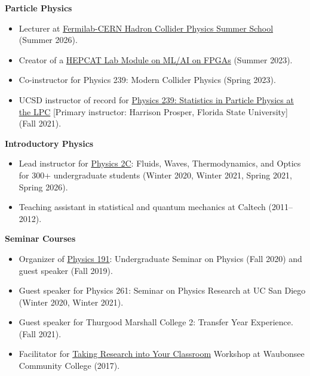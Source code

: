 \documentclass[11pt]{res}
\begin{document}
\begin{resume}
  \textbf{Particle Physics}
  \begin{itemize}
    \itemsep-0.3em
    \item Lecturer at \href{https://indico.fnal.gov/event/71907/}{Fermilab-CERN Hadron Collider Physics Summer School} (Summer 2026).
    \item Creator of a \href{https://hepcat.ucsd.edu/summer-schools/fast-ml-fpga-lab/}{HEPCAT Lab Module on ML/AI on FPGAs} (Summer 2023).
    \item Co-instructor for Physics 239: Modern Collider Physics ({Spring 2023}).
    \item UCSD instructor of record for \href{https://indico.cern.ch/event/1066958/}{Physics 239: Statistics in Particle Physics at the LPC} [Primary instructor: Harrison Prosper, Florida State University] ({Fall 2021}).
  \end{itemize}

  \textbf{Introductory Physics}
  \begin{itemize}
    \itemsep-0.3em
    \item Lead instructor for \href{https://jduarte.physics.ucsd.edu/phys2c/index.html}{Physics 2C}: Fluids, Waves, Thermodynamics, and Optics for 300+ undergraduate students ({Winter 2020, Winter 2021, Spring 2021, Spring 2026}).
    \item Teaching assistant in statistical and quantum mechanics at Caltech ({2011--2012}).
  \end{itemize}

  \textbf{Seminar Courses}
  \begin{itemize}
    \itemsep-0.3em
    \item Organizer of \href{https://indico.cern.ch/event/956641/}{Physics 191}: Undergraduate Seminar on Physics ({Fall 2020}) and guest speaker ({Fall 2019}).
    \item Guest speaker for Physics 261: Seminar on Physics Research at UC San Diego ({Winter 2020, Winter 2021}).
    \item Guest speaker for Thurgood Marshall College 2: Transfer Year Experience. ({Fall 2021}).
    \item Facilitator for \href{http://eddata.fnal.gov/lasso/program_search/show_workshopID_new.lasso?event_id=435}{Taking Research into Your Classroom} Workshop at Waubonsee Community College ({2017}).
  \end{itemize}



\end{resume}
\end{document}
